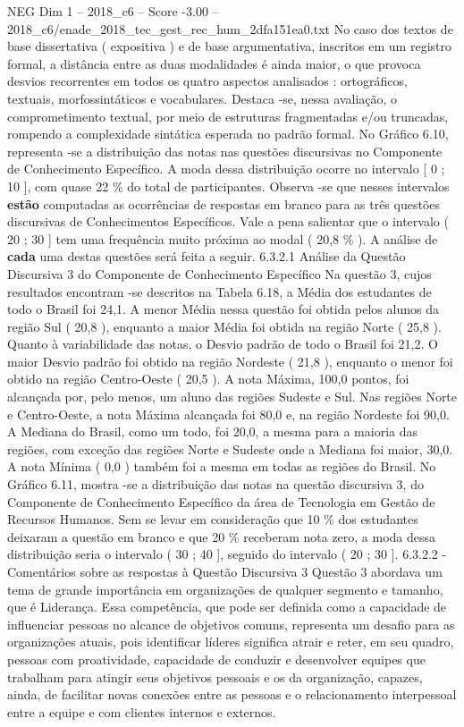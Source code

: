 \begin{textsample}{NEG Dim 1 – 2018\_c6 – Score -3.00 – 2018\_c6/enade\_2018\_tec\_gest\_rec\_hum\_2dfa151ea0.txt}
No caso dos textos de base dissertativa ( expositiva ) e de base argumentativa, inscritos em um registro formal, a distância entre as duas modalidades é ainda maior, o que provoca desvios recorrentes em todos os quatro aspectos analisados : ortográficos, textuais, morfossintáticos e vocabulares.
Destaca -se, nessa avaliação, o comprometimento textual, por meio de estruturas fragmentadas e/ou truncadas, rompendo a complexidade sintática esperada no padrão formal.
No Gráfico 6.10, representa -se a distribuição das notas nas questões discursivas no Componente de Conhecimento Específico.
A moda dessa distribuição ocorre no intervalo [ 0 ; 10 ], com quase 22 \% do total de participantes.
Observa -se que nesses intervalos \textbf{estão} computadas as ocorrências de respostas em branco para as três questões discursivas de Conhecimentos Específicos.
Vale a pena salientar que o intervalo ( 20 ; 30 ] tem uma frequência muito próxima ao modal ( 20,8 \% ).
A análise de \textbf{cada} uma destas questões será feita a seguir. 6.3.2.1 Análise da Questão Discursiva 3 do Componente de Conhecimento Específico Na questão 3, cujos resultados encontram -se descritos na Tabela 6.18, a Média dos estudantes de todo o Brasil foi 24,1.
A menor Média nessa questão foi obtida pelos alunos da região Sul ( 20,8 ), enquanto a maior Média foi obtida na região Norte ( 25,8 ).
Quanto à variabilidade das notas, o Desvio padrão de todo o Brasil foi 21,2.
O maior Desvio padrão foi obtido na região Nordeste ( 21,8 ), enquanto o menor foi obtido na região Centro-Oeste ( 20,5 ).
A nota Máxima, 100,0 pontos, foi alcançada por, pelo menos, um aluno das regiões Sudeste e Sul.
Nas regiões Norte e Centro-Oeste, a nota Máxima alcançada foi 80,0 e, na região Nordeste foi 90,0.
A Mediana do Brasil, como um todo, foi 20,0, a mesma para a maioria das regiões, com exceção das regiões Norte e Sudeste onde a Mediana foi maior, 30,0.
A nota Mínima ( 0,0 ) também foi a mesma em todas as regiões do Brasil.
No Gráfico 6.11, mostra -se a distribuição das notas na questão discursiva 3, do Componente de Conhecimento Específico da área de Tecnologia em Gestão de Recursos Humanos.
Sem se levar em consideração que 10 \% dos estudantes deixaram a questão em branco e que 20 \% receberam nota zero, a moda dessa distribuição seria o intervalo ( 30 ; 40 ], seguido do intervalo ( 20 ; 30 ]. 6.3.2.2 - Comentários sobre as respostas à Questão Discursiva 3 Questão 3 abordava um tema de grande importância em organizações de qualquer segmento e tamanho, que é Liderança.
Essa competência, que pode ser definida como a capacidade de influenciar pessoas no alcance de objetivos comuns, representa um desafio para as organizações atuais, pois identificar líderes significa atrair e reter, em seu quadro, pessoas com proatividade, capacidade de conduzir e desenvolver equipes que trabalham para atingir seus objetivos pessoais e os da organização, capazes, ainda, de facilitar novas conexões entre as pessoas e o relacionamento interpessoal entre a equipe e com clientes internos e externos.

\end{textsample}
